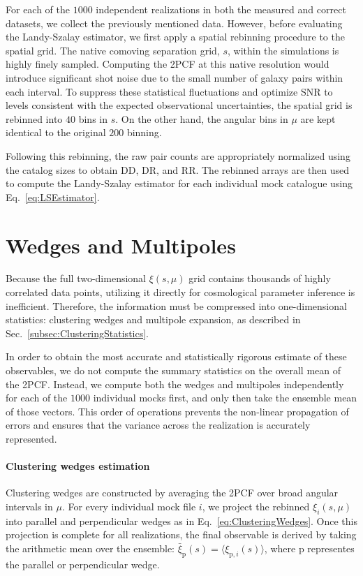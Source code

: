 \documentclass[12pt,a4paper,oneside]{report}
\begin{document}
For each of the $1000$ independent realizations in both the measured and correct datasets, we collect the previously mentioned data.
However, before evaluating the Landy-Szalay estimator, we first apply a spatial rebinning procedure to the spatial grid. The native comoving separation grid, $s$, within the simulations is highly finely sampled. Computing the 2PCF at this native resolution would introduce significant shot noise due to the small number of galaxy pairs within each interval. To suppress these statistical fluctuations and optimize SNR to levels consistent with the expected observational uncertainties, the spatial grid is rebinned into $40$ bins in $s$. On the other hand, the angular bins in $\mu$ are kept identical to the original $200$ binning.

Following this rebinning, the raw pair counts are appropriately normalized using the catalog sizes to obtain $\mathrm{DD}$, $\mathrm{DR}$, and $\mathrm{RR}$. The rebinned arrays are then used to compute the Landy-Szalay estimator for each individual mock catalogue using Eq.~\ref{eq:LSEstimator}.

\section{Wedges and Multipoles}\label{sec:WedgesAndMultipoles}
Because the full two-dimensional $\xi(s, \mu)$ grid contains thousands of highly correlated data points, utilizing it directly for cosmological parameter inference is inefficient. Therefore, the information must be compressed into one-dimensional statistics: clustering wedges and multipole expansion, as described in Sec.~\ref{subsec:ClusteringStatistics}.

In order to obtain the most accurate and statistically rigorous estimate of these observables, we do not compute the summary statistics on the overall mean of the 2PCF. Instead, we compute both the wedges and multipoles independently for each of the $1000$ individual mocks first, and only then take the ensemble mean of those vectors. This order of operations prevents the non-linear propagation of errors and ensures that the variance across the realization is accurately represented.

\paragraph{Clustering wedges estimation}\label{parag:ClusteringWedgesEstimation}
Clustering wedges are constructed by averaging the 2PCF over broad angular intervals in $\mu$. For every individual mock file $i$, we project the rebinned $\xi_i(s, \mu)$ into parallel and perpendicular wedges as in Eq.~\eqref{eq:ClusteringWedges}.
Once this projection is complete for all realizations, the final observable is derived by taking the arithmetic mean over the ensemble: $\bar{\xi}_\mathrm{p}(s) = \langle \xi_{\mathrm{p}, i}(s) \rangle$, where $\mathrm{p}$ representes the parallel or perpendicular wedge.
\end{document}
